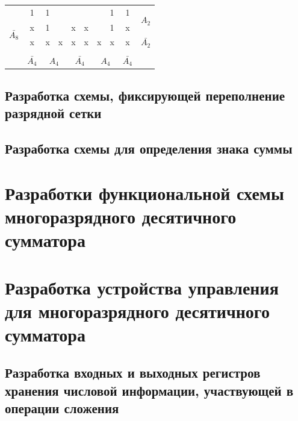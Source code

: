 \documentclass[a4paper,14pt]{article}
\begin{document}
\begin{table}[!htb]
\begin{minipage}{.5\linewidth}
\begin{tabular}{cccccccccc}
			\multicolumn{1}{c|}{} & \multicolumn{1}{c|}{1} & \multicolumn{1}{c|}{1} & \multicolumn{1}{c|}{} & \multicolumn{1}{c|}{} & \multicolumn{1}{c|}{} & \multicolumn{1}{c|}{} & \multicolumn{1}{c|}{1} & \multicolumn{1}{c|}{1} & \multirow{2}{*}{$A_2$} \\ \cline{2-9}
			\multicolumn{1}{c|}{\multirow{2}{*}{$\bar{A_8}$}} & \multicolumn{1}{c|}{x} & \multicolumn{1}{c|}{1} & \multicolumn{1}{c|}{} & \multicolumn{1}{c|}{x} & \multicolumn{1}{c|}{x} & \multicolumn{1}{c|}{} & \multicolumn{1}{c|}{1} & \multicolumn{1}{c|}{x} &  \\ \cline{2-9}
			\multicolumn{1}{c|}{} & \multicolumn{1}{c|}{x} & \multicolumn{1}{c|}{x} & \multicolumn{1}{c|}{x} & \multicolumn{1}{c|}{x} & \multicolumn{1}{c|}{x} & \multicolumn{1}{c|}{x} & \multicolumn{1}{c|}{x} & \multicolumn{1}{c|}{x} & $\bar{A_2}$ \\ \cline{2-9}
			\\
			& $\bar{A_4}$ & \multicolumn{2}{c}{$A_4$} & \multicolumn{2}{c}{$\bar{A_4}$} & \multicolumn{2}{c}{$A_4$} & $\bar{A_4}$ & 
		\end{tabular}
	\end{minipage} 
\end{table}

\subsection{Разработка схемы, фиксирующей переполнение разрядной сетки}

\subsection{Разработка схемы для определения знака суммы}

\section{Разработки функциональной схемы многоразрядного десятичного сумматора}

\section{Разработка устройства управления для многоразрядного десятичного сумматора}

\subsection{Разработка входных и выходных регистров хранения числовой информации, участвующей в операции сложения}
\end{document}
